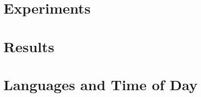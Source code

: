 \documentclass[sigconf,10pt]{acmart}
\newcommand{\ignore}[1]{}
\begin{document}
\section{Experiments}

\begin{figure}
\noindent
\caption{}
\end{figure}

\newpage


\section{Results}

\newpage
\appendix
\ignore{
\section{Languages and Day of Week}
\noindent

\noindent

\noindent

\noindent

\noindent

\noindent

\noindent

\noindent

\noindent

\noindent

\noindent

\noindent

\noindent

\noindent

\noindent

\noindent

\noindent

\noindent

\noindent

\noindent

\noindent
}

\onecolumn
\section{Languages and Time of Day}
\noindent
\end{document}
